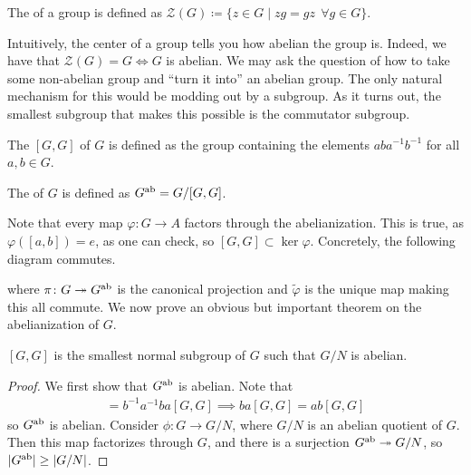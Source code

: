 \documentclass[11pt]{article}
\begin{document}
\begin{definition}
    The  of a group is defined as
    $\mathcal{Z}(G) \coloneqq \{ z \in G \mid zg = gz \: \: \forall g \in G \}$.
\end{definition}

Intuitively, the center of a group tells you how abelian the group is.
Indeed, we have that $\mathcal{Z}(G) = G \iff G$ is abelian.
We may ask the question of how to take some non-abelian group
and ``turn it into'' an abelian group. The only natural mechanism
for this would be modding out by a subgroup. As it turns out,
the smallest subgroup that makes this possible is the commutator
subgroup.

\begin{definition}
    The  $[G, G]$ of $G$ is
    defined as the group containing the elements $ab a^{-1} b^{-1}$
    for all $a, b \in G$.
\end{definition}

\begin{definition}
    The  of $G$ is defined as $G^{\rm ab} = G/[G, G]$.
\end{definition}

Note that every map $\varphi \colon G \to A$ factors through 
the abelianization. This is true, as $\varphi([a, b]) = e$,
as one can check, so $[G, G] \subset \ker{\varphi}$.
Concretely, the following diagram commutes.


\begin{center}
\end{center}
\noin
where $\pi \colon G \twoheadrightarrow G^{\rm ab}$ is the canonical
projection and $\widetilde{\varphi}$ is the unique map making this
all commute. We now prove an obvious but important theorem on the 
abelianization of $G$.

\begin{theorem}
    $[G, G]$ is the smallest normal subgroup of $G$ such that $G/N$ is abelian.
\end{theorem}

\begin{proof}
    We first show that $G^{\rm ab}$ is abelian. Note that
    \begin{align*}
        [G, G] = b^{-1} a^{-1} b a [G, G] \implies ba [G, G] = ab [G, G]
    \end{align*}
    so $G^{\rm ab}$ is abelian. Consider $\phi \colon G \to G/N$, where
    $G/N$ is an abelian quotient of $G$. Then this map factorizes through
    $G$, and there is a surjection $G^{\rm ab} \twoheadrightarrow G/N$, so 
    $|G^{\rm ab}| \geq |G/N|$. 
\end{proof}
\end{document}
